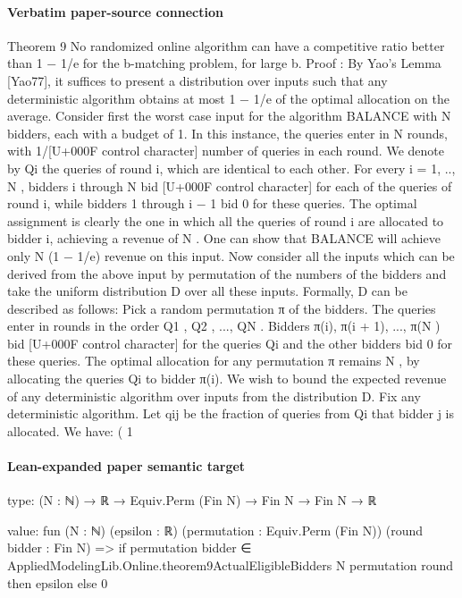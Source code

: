 \documentclass[10pt]{article}
\begin{document}
\paragraph{Verbatim paper-source connection}
\begin{ReviewVerbatim}
Theorem 9 No randomized online algorithm can have a competitive ratio better than 1 − 1/e
for the b-matching problem, for large b.
Proof : By Yao’s Lemma [Yao77], it suffices to present a distribution over inputs such that
any deterministic algorithm obtains at most 1 − 1/e of the optimal allocation on the average.
Consider first the worst case input for the algorithm BALANCE with N bidders, each with
a budget of 1. In this instance, the queries enter in N rounds, with 1/[U+000F control character] number of queries in
each round. We denote by Qi the queries of round i, which are identical to each other. For
every i = 1, .., N , bidders i through N bid [U+000F control character] for each of the queries of round i, while bidders 1
through i − 1 bid 0 for these queries. The optimal assignment is clearly the one in which all
the queries of round i are allocated to bidder i, achieving a revenue of N . One can show that
BALANCE will achieve only N (1 − 1/e) revenue on this input.
Now consider all the inputs which can be derived from the above input by permutation of the
numbers of the bidders and take the uniform distribution D over all these inputs. Formally, D
can be described as follows: Pick a random permutation π of the bidders. The queries enter
in rounds in the order Q1 , Q2 , ..., QN . Bidders π(i), π(i + 1), ..., π(N ) bid [U+000F control character] for the queries Qi
and the other bidders bid 0 for these queries. The optimal allocation for any permutation
π remains N , by allocating the queries Qi to bidder π(i). We wish to bound the expected
revenue of any deterministic algorithm over inputs from the distribution D.
Fix any deterministic algorithm. Let qij be the fraction of queries from Qi that bidder j is
allocated. We have:
(
1
\end{ReviewVerbatim}



\paragraph{Lean-expanded paper semantic target}
\begin{ReviewVerbatim}
type:
(N : ℕ) → ℝ → Equiv.Perm (Fin N) → Fin N → Fin N → ℝ

value:
fun (N : ℕ) (epsilon : ℝ) (permutation : Equiv.Perm (Fin N)) (round bidder : Fin N) =>
  if permutation bidder ∈ AppliedModelingLib.Online.theorem9ActualEligibleBidders N permutation round then epsilon
  else 0
\end{ReviewVerbatim}
\end{document}
